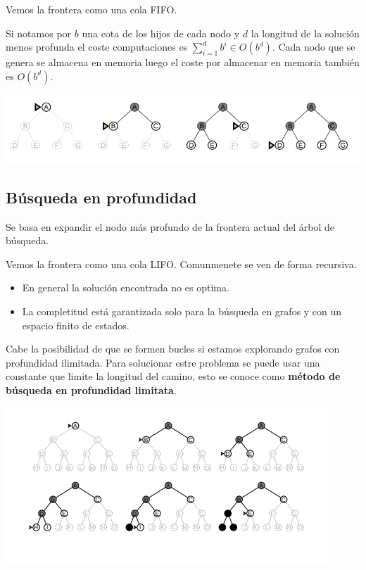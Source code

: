 \documentclass[12pt]{article}
\begin{document}
Vemos la frontera como una cola FIFO.

Si notamos por $b$ una cota de los hijos de cada nodo y $d$ la
longitud de la solución menos profunda el coste computaciones es
$\sum_{i=1}^{d}b^i \in O(b^d)$. Cada nodo que se genera se almacena en
memoria luego el coste por almacenar en memoria también es $O(b^d)$.

\includegraphics[width=\textwidth]{anchura}

\subsection{Búsqueda en profundidad}

Se basa en expandir el nodo más profundo de la frontera actual del
árbol de búsqueda.

Vemos la frontera como una cola LIFO. Comunmenete se ven de forma
recursiva.

\begin{itemize}
\item En general la solución encontrada no es optima.
\item La completitud está garantizada solo para la búsqueda en grafos
  y con un espacio finito de estados.
\end{itemize}

Cabe la posibilidad de que se formen bucles si estamos explorando
grafos con profundidad ilimitada. Para solucionar estre problema se
puede usar una constante que limite la longitud del camino, esto se
conoce como \textbf{método de búsqueda en profundidad limitata}.

\includegraphics[width=\textwidth]{profundidad}
\end{document}

